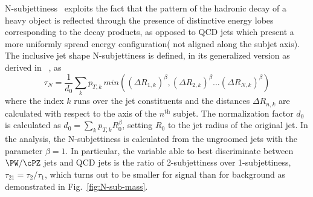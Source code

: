 N-subjettiness~\cite{Thaler:2010tr,Thaler:2011gf,Stewart:2010tn} exploits the fact that the pattern of the hadronic decay of a heavy object is reflected through the presence of distinctive energy lobes corresponding to the decay products, as opposed to QCD jets which present a more uniformly spread energy configuration( not aligned along the subjet axis). The inclusive jet shape N-subjettiness is defined, in its generalized version as derived in ~\cite{Thaler:2010tr}, as 
%
\begin{equation}
\tau_N = \frac{1}{d_{0}} \sum_{k} p_{T,k}\,min( (\Delta R_{1,k})^{\beta}, (\Delta R_{2,k})^{\beta}...(\Delta R_{N,k})^{\beta})
\end{equation}
%
where the index $k$ runs over the jet constituents and the distances
$\Delta R_{n,k}$ are calculated with respect to the axis of the $n^{\mathrm{th}}$
subjet. The normalization factor $d_{0}$ is calculated as $d_{0}=
\sum_{k} p_{T,k}R^{\beta}_{0}$, setting $R_{0}$ to the jet radius of
the original jet. In the analysis, the N-subjettiness is calculated
from the ungroomed jets with the parameter $\beta=1$. In particular,
the variable able to best discriminate between $\PW/\cPZ$ jets and QCD jets
is the ratio of 2-subjettiness over 1-subjettiness,
$\tau_{21}=\tau_{2} / \tau_{1}$, which turns out to be smaller for signal than for background as demonstrated in Fig.~\ref{fig:N-sub-mass}.

